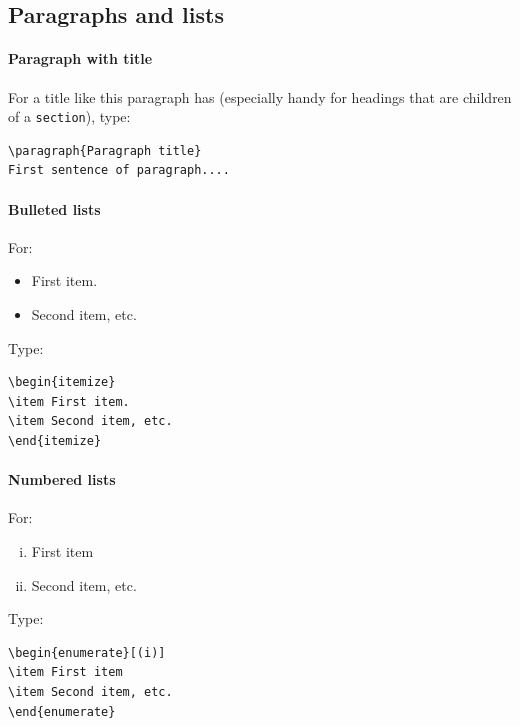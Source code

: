\subsection{Paragraphs and lists}
\paragraph{Paragraph with title} For a title like this paragraph has (especially handy for headings that are children of a \verb+section+), type:
\begin{verbatim}
\paragraph{Paragraph title}
First sentence of paragraph....
\end{verbatim}

\paragraph{Bulleted lists} For:
\begin{itemize}
\item First item.
\item Second item, etc.
\end{itemize}
Type:
\begin{verbatim}
\begin{itemize}
\item First item.
\item Second item, etc.
\end{itemize}
\end{verbatim}

\paragraph{Numbered lists} For:

\begin{enumerate}[(i)]
\item First item
\item Second item, etc. 
\end{enumerate}

Type:
\begin{verbatim}
\begin{enumerate}[(i)]
\item First item
\item Second item, etc. 
\end{enumerate}
\end{verbatim}

